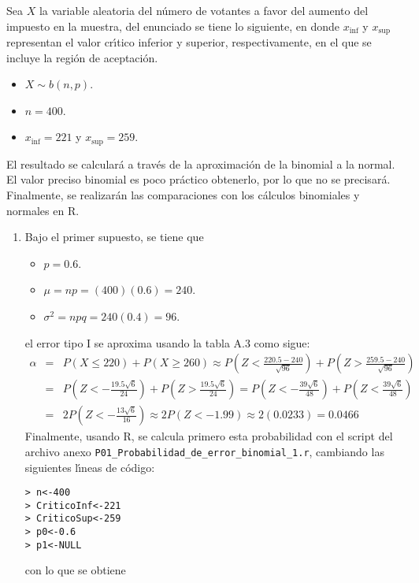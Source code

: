 \begin{solucion}
 Sea $X$ la variable aleatoria del n\'umero de votantes a favor del aumento del impuesto en la muestra, del enunciado se tiene lo siguiente, en donde $x_{\text{inf}}$ y $x_{\text{sup}}$ representan el valor cr\'{\i}tico inferior y superior, respectivamente, en el que se incluye la regi\'on de aceptaci\'on.
 \begin{itemize}
  \item $X \sim b(n,p)$.
  \item $n = 400$.
  \item $x_{\text{inf}} = 221$ y $x_{\text{sup}} = 259$.
 \end{itemize}
 El resultado se calcular\'a a trav\'es de la aproximaci\'on de la binomial a la normal. El valor preciso binomial es poco pr\'actico obtenerlo, por lo que no se precisar\'a. Finalmente, se realizar\'an las comparaciones con los c\'alculos binomiales y normales en R.
 \begin{enumerate}
  \item Bajo el primer supuesto, se tiene que
  \begin{itemize}
   \item $p = 0.6$.
   \item $\mu = np = (400)(0.6) = 240$.
   \item $\sigma^2 = npq = 240(0.4) = 96$.
  \end{itemize}
  el error tipo I se aproxima usando la tabla A.3 como sigue:
  \begin{eqnarray*}
   \alpha & = & P(X \leq 220) + P(X \geq 260) \approx P\left( Z < \frac{220.5 - 240}{\sqrt{96}} \right) + P\left( Z > \frac{259.5 - 240}{\sqrt{96}} \right) \\
   & = & P\left( Z < -\frac{19.5\sqrt{6}}{24} \right) + P\left( Z > \frac{19.5\sqrt{6}}{24} \right) = P\left( Z < -\frac{39\sqrt{6}}{48} \right) + P\left( Z < \frac{39\sqrt{6}}{48} \right) \\
   & = & 2P\left( Z < -\frac{13\sqrt{6}}{16} \right) \approx 2P(Z < -1.99) \approx 2(0.0233) = 0.0466
  \end{eqnarray*}
  Finalmente, usando R, se calcula primero esta probabilidad con el script del archivo anexo \texttt{P01\_Probabilidad\_de\_error\_binomial\_1.r}, cambiando las siguientes l\'{\i}neas de c\'odigo:
  \begin{verbatim}
> n<-400
> CriticoInf<-221
> CriticoSup<-259
> p0<-0.6
> p1<-NULL
  \end{verbatim}
  \vspace{-0.5cm}
  con lo que se obtiene

\end{enumerate}
\end{solucion}

